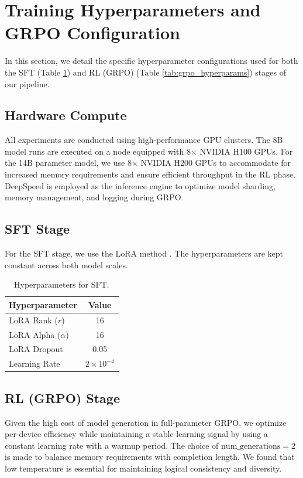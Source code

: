 \documentclass{article}
\theoremstyle{plain}
\theoremstyle{definition}
\theoremstyle{remark}
\begin{document}
\newpage
\section{Training Hyperparameters and GRPO Configuration}
\label{Appendix E}
In this section, we detail the specific hyperparameter configurations used for both the SFT (Table \ref{tab:sft_hyperparams}) and RL (GRPO) (Table \ref{tab:grpo_hyperparams}) stages of our pipeline.

\subsection{Hardware Compute}
All experiments are conducted using high-performance GPU clusters. The 8B model runs are executed on a node equipped with 8$\times$ NVIDIA H100 GPUs. For the 14B parameter model, we use 8$\times$ NVIDIA H200 GPUs to accommodate for increased memory requirements and ensure efficient throughput in the RL phase. DeepSpeed is employed as the inference engine to optimize model sharding, memory management, and logging during GRPO.

\subsection{SFT Stage}
For the SFT stage, we use the LoRA method \cite{hu2022lora}. The hyperparameters are kept constant across both model scales. 

\begin{table}[ht]
\caption{Hyperparameters for SFT.}
\label{tab:sft_hyperparams}
\vskip 0.15in
\begin{center}
\begin{small}
\begin{sc}
\begin{tabular}{lc}
\toprule
Hyperparameter & Value \\
\midrule
LoRA Rank ($r$) & 16 \\
LoRA Alpha ($\alpha$) & 16 \\
LoRA Dropout & 0.05 \\
Learning Rate & $2 \times 10^{-4}$ \\
\bottomrule
\end{tabular}
\end{sc}
\end{small}
\end{center}
\vskip -0.1in
\end{table}

\subsection{RL (GRPO) Stage}
Given the high cost of model generation in full-parameter GRPO, we optimize per-device efficiency while maintaining a stable learning signal by using a constant learning rate with a warmup period. The choice of $\text{num\_generations} = 2$ is made to balance memory requirements with completion length. We found that low temperature is essential for maintaining logical consistency and diversity.
\end{document}

